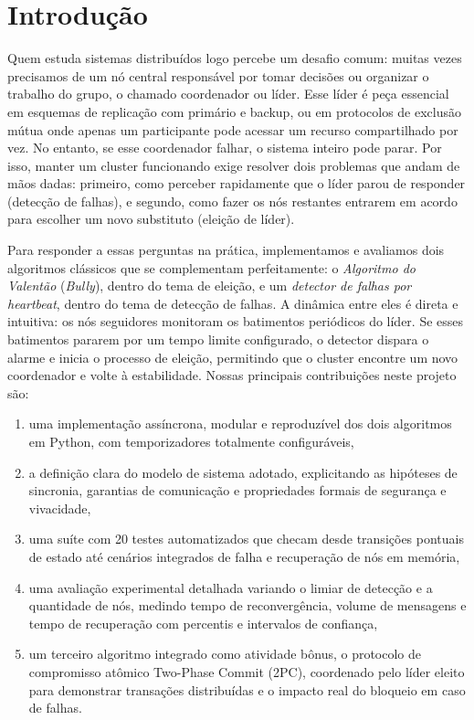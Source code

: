 \documentclass[journal]{IEEEtran}
\begin{document}
\IEEEpeerreviewmaketitle

\section{Introdução}
Quem estuda sistemas distribuídos logo percebe um desafio comum: muitas vezes precisamos de um nó central responsável por tomar decisões ou organizar o trabalho do grupo, o chamado coordenador ou líder. Esse líder é peça essencial em esquemas de replicação com primário e backup, ou em protocolos de exclusão mútua onde apenas um participante pode acessar um recurso compartilhado por vez. No entanto, se esse coordenador falhar, o sistema inteiro pode parar. Por isso, manter um cluster funcionando exige resolver dois problemas que andam de mãos dadas: primeiro, como perceber rapidamente que o líder parou de responder (detecção de falhas), e segundo, como fazer os nós restantes entrarem em acordo para escolher um novo substituto (eleição de líder).

Para responder a essas perguntas na prática, implementamos e avaliamos dois algoritmos clássicos que se complementam perfeitamente: o \emph{Algoritmo do Valentão} (\emph{Bully}), dentro do tema de eleição, e um \emph{detector de falhas por heartbeat}, dentro do tema de detecção de falhas. A dinâmica entre eles é direta e intuitiva: os nós seguidores monitoram os batimentos periódicos do líder. Se esses batimentos pararem por um tempo limite configurado, o detector dispara o alarme e inicia o processo de eleição, permitindo que o cluster encontre um novo coordenador e volte à estabilidade. Nossas principais contribuições neste projeto são:

\begin{enumerate}
    \item uma implementação assíncrona, modular e reproduzível dos dois algoritmos em Python, com temporizadores totalmente configuráveis,
    \item a definição clara do modelo de sistema adotado, explicitando as hipóteses de sincronia, garantias de comunicação e propriedades formais de segurança e vivacidade,
    \item uma suíte com 20 testes automatizados que checam desde transições pontuais de estado até cenários integrados de falha e recuperação de nós em memória,
    \item uma avaliação experimental detalhada variando o limiar de detecção e a quantidade de nós, medindo tempo de reconvergência, volume de mensagens e tempo de recuperação com percentis e intervalos de confiança,
    \item um terceiro algoritmo integrado como atividade bônus, o protocolo de compromisso atômico Two-Phase Commit (2PC), coordenado pelo líder eleito para demonstrar transações distribuídas e o impacto real do bloqueio em caso de falhas.
\end{enumerate}
\end{document}
